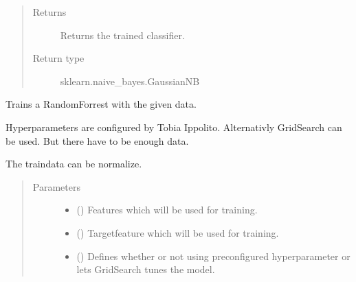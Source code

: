 \documentclass[letterpaper,10pt,english]{sphinxmanual}
\begin{document}
\begin{fulllineitems}
\begin{quote}
\begin{description}
\begin{itemize}
\end{itemize}

\item[{Returns}] \leavevmode
\sphinxAtStartPar
Returns the trained classifier.

\item[{Return type}] \leavevmode
\sphinxAtStartPar
sklearn.naive\_bayes.GaussianNB

\end{description}\end{quote}

\end{fulllineitems}


\begin{fulllineitems}
\label{\detokenize{anoog.model:anoog.model.model.train_random_forest}}
\sphinxAtStartPar
Trains a RandomForrest with the given data.

\sphinxAtStartPar
Hyperparameters are configured by Tobia Ippolito. Alternativly GridSearch can be used. But there have to be enough data.

\sphinxAtStartPar
The traindata can be normalize.
\begin{quote}\begin{description}
\item[{Parameters}] \leavevmode\begin{itemize}
\item {} 
\sphinxAtStartPar
{} () \textendash{} Features which will be used for training.

\item {} 
\sphinxAtStartPar
{} () \textendash{} Target\sphinxhyphen{}feature which will be used for training.

\item {} 
\sphinxAtStartPar
{} (\sphinxstyleliteralemphasis{\sphinxupquote{, }}) \textendash{} Defines whether or not using preconfigured hyperparameter or lets GridSearch tunes the model.


\end{itemize}
\end{description}
\end{quote}
\end{fulllineitems}
\end{document}
